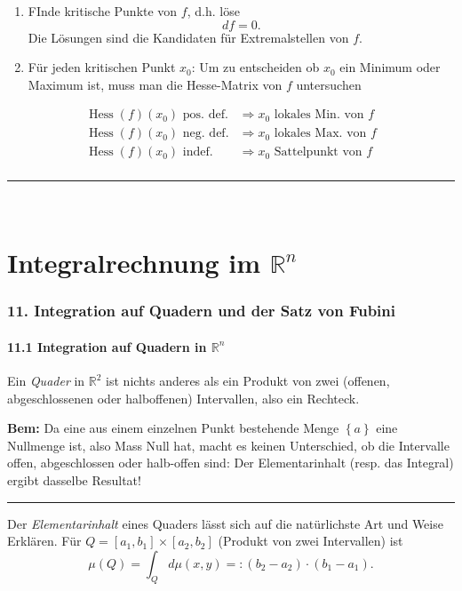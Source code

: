 \documentclass[a4paper,landscape,8pt]{extarticle}
\newcommand{\R}{\mathbb{R}}
\newcommand{\sep}{\vspace{5pt}\noindent\hrule\vspace{5pt}}
\newcommand{\Bem}{\textbf{Bem: }}
\DeclareMathOperator{\Hess}{Hess}
\renewcommand*{\newpage}{ \ }
\begin{document}
\begin{multicols*}{4}
\begin{enumerate}
  \item FInde kritische Punkte von $f$, d.h. löse
  \[
  df=0.
  \]
  Die Lösungen sind die Kandidaten für Extremalstellen von $f$.
  \item Für jeden kritischen Punkt $x_0$: Um
  zu entscheiden ob $x_0$ ein Minimum oder Maximum ist, muss man die
  Hesse-Matrix von $f$ untersuchen
\end{enumerate}
\begin{align*}
\Hess(f)(x_0) \text{ pos. def.} &\Longrightarrow x_0 \text{ lokales
Min. von } f\\
\Hess(f)(x_0) \text{ neg. def.} &\Longrightarrow x_0 \text{ lokales
Max. von } f\\
\Hess(f)(x_0) \text{ indef.} &\Longrightarrow x_0 \text{ Sattelpunkt von }
f\\
\end{align*}

\sep


\newpage

\part{Integralrechnung im $\R^n$}

\section{11. Integration auf Quadern und der Satz von Fubini}

\subsection{11.1 Integration auf Quadern in $\R^n$}

\Def Ein \emph{Quader} in $\R^2$ ist nichts anderes als ein Produkt von zwei
(offenen, abgeschlossenen oder halboffenen) Intervallen, also ein Rechteck.

\Bem Da eine aus einem einzelnen Punkt bestehende Menge $\left\{a\right\}$ eine
Nullmenge ist, also Mass Null hat, macht es keinen Unterschied, ob die
Intervalle offen, abgeschlossen oder halb-offen sind: Der Elementarinhalt
(resp. das Integral) ergibt dasselbe Resultat!

\sep

\Def Der \emph{Elementarinhalt} eines Quaders lässt sich auf die natürlichste
Art und Weise Erklären. Für $Q=[a_1,b_1]\times[a_2,b_2]$ (Produkt von zwei
Intervallen) ist
\[
\mu(Q) = \int_{Q}d\mu(x,y) =: (b_2-a_2)\cdot(b_1-a_1).
\]


\end{multicols*}
\end{document}
